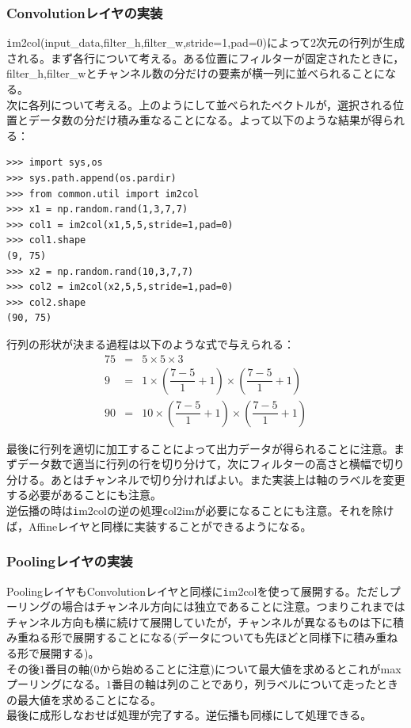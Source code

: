 \documentclass{jarticle}
\begin{document}
\subsubsection{Convolutionレイヤの実装}
{\texttt im2col(input\_data,filter\_h,filter\_w,stride=1,pad=0)}によって$2$次元の行列が生成される。まず各行について考える。ある位置にフィルターが固定されたときに，filter\_h,filter\_wとチャンネル数の分だけの要素が横一列に並べられることになる。\\
次に各列について考える。上のようにして並べられたベクトルが，選択される位置とデータ数の分だけ積み重なることになる。よって以下のような結果が得られる：
\begin{lstlisting}
>>> import sys,os
>>> sys.path.append(os.pardir)
>>> from common.util import im2col
>>> x1 = np.random.rand(1,3,7,7)
>>> col1 = im2col(x1,5,5,stride=1,pad=0)
>>> col1.shape
(9, 75)
>>> x2 = np.random.rand(10,3,7,7)
>>> col2 = im2col(x2,5,5,stride=1,pad=0)
>>> col2.shape
(90, 75)
\end{lstlisting}
行列の形状が決まる過程は以下のような式で与えられる：
\begin{eqnarray*}
75 &=& 5\times5\times3\\
9 &=& 1\times (\dfrac{7-5}{1}+1)\times(\dfrac{7-5}{1}+1)\\
90 &=& 10\times (\dfrac{7-5}{1}+1)\times(\dfrac{7-5}{1}+1)
\end{eqnarray*}

最後に行列を適切に加工することによって出力データが得られることに注意。まずデータ数で適当に行列の行を切り分けて，次にフィルターの高さと横幅で切り分ける。あとはチャンネルで切り分ければよい。また実装上は軸のラベルを変更する必要があることにも注意。\\
逆伝播の時は{\texttt im2col}の逆の処理{\texttt col2im}が必要になることにも注意。それを除けば，Affineレイヤと同様に実装することができるようになる。

\subsubsection{Poolingレイヤの実装}
PoolingレイヤもConvolutionレイヤと同様に{\texttt im2col}を使って展開する。ただしプーリングの場合はチャンネル方向には独立であることに注意。つまりこれまではチャンネル方向も横に続けて展開していたが，チャンネルが異なるものは下に積み重ねる形で展開することになる(データについても先ほどと同様下に積み重ねる形で展開する)。\\
その後$1$番目の軸($0$から始めることに注意)について最大値を求めるとこれがmaxプーリングになる。$1$番目の軸は列のことであり，列ラベルについて走ったときの最大値を求めることになる。\\
最後に成形しなおせば処理が完了する。逆伝播も同様にして処理できる。
\end{document}
